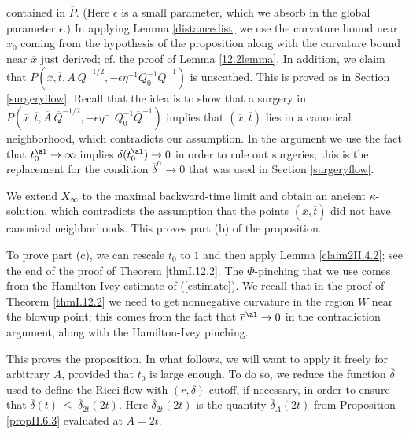 contained in $\overline{P}$.
(Here $\epsilon$ is a small parameter, which we absorb in the
global parameter $\epsilon$.)
In applying Lemma \ref{distancedist} we use the curvature
bound near $x_0$ coming from the hypothesis of the proposition along with
the curvature bound near $\overline{x}$ just derived; cf. the proof
of Lemma \ref{12.2lemma}.
In addition, we claim that
$P(\overline{x}, \overline{t}, \overline{A} \: \overline{Q}^{-1/2},
- \epsilon \eta^{-1} Q_0^{-1} \overline{Q}^{-1})$ is
unscathed. This is proved as in Section \ref{surgeryflow}.
Recall that the idea is to show that a surgery in
$P(\overline{x}, \overline{t}, \overline{A} \: \overline{Q}^{-1/2},
- \epsilon \eta^{-1} Q_0^{-1} \overline{Q}^{-1})$ implies that
$(\overline{x}, \overline{t})$ lies in a canonical neighborhood,
which contradicts our assumption. In the argument
we use the fact that $t_0^\al \rightarrow \infty$
implies $\delta(t_0^\al) \rightarrow 0$ in order to rule out
surgeries; this is the replacement for the condition
$\overline{\delta}^{\alpha} \rightarrow 0$ that was used in
Section \ref{surgeryflow}.


We extend $X_\infty$ to the maximal backward-time limit and
obtain an ancient $\kappa$-solution, which contradicts the assumption
that the points $(\overline{x}, \overline{t})$ did not have
canonical neighborhoods. This proves part (b) of the proposition.

To prove part (c),
we can rescale $t_0$ to $1$ and then apply
Lemma \ref{claim2II.4.2}; see the end of the proof of Theorem
\ref{thmI.12.2}.
The $\Phi$-pinching that we use comes from the Hamilton-Ivey
estimate of (\ref{estimate}).
We recall that in the proof of Theorem \ref{thmI.12.2}
we need to get nonnegative curvature in the region $W$ near the
blowup point;
this comes from the fact that $\overline{r}^\al \rightarrow 0$ in the
contradiction argument, along with the Hamilton-Ivey pinching.
\endgroup\par\medskip

This proves the proposition.
In what follows, we will want to apply it freely for arbitrary
$A$, provided that $t_0$ is large enough. To do so,
we reduce the function $\overline{\delta}$ used to define the
Ricci flow with $(r, \delta)$-cutoff, if necessary, in order to ensure
that $\overline{\delta}(t) \: \le \: \overline{\delta}_{2t}(2t)$.
Here $\overline{\delta}_{2t}(2t)$ is the quantity
$\overline{\delta}_{A}(2t)$ from Proposition \ref{propII.6.3}
evaluated at $A = 2t$.



